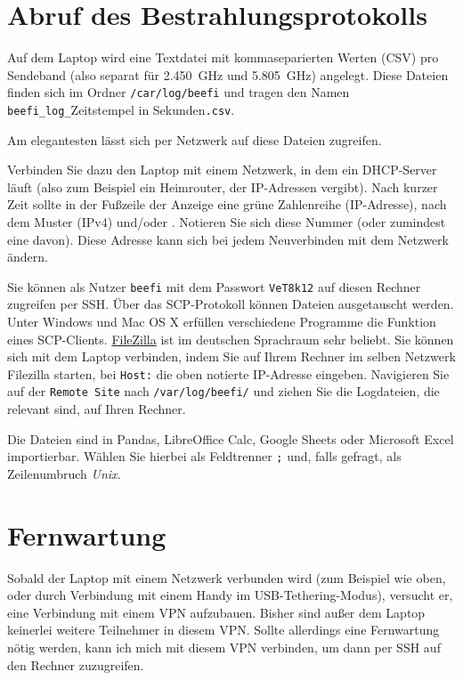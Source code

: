 \documentclass[a4paper,twoside]{scrreprt}
\newcommand{\lowf}{\SI{2.450}{\giga\hertz}}
\newcommand{\highf}{\SI{5.805}{\giga\hertz}}
\begin{document}
\section{Abruf des Bestrahlungsprotokolls}

Auf dem Laptop wird eine Textdatei mit kommaseparierten Werten (CSV) pro
Sendeband (also separat für \lowf{} und \highf) angelegt. Diese Dateien finden
sich im Ordner \texttt{/car/log/beefi} und tragen den Namen
\texttt{beefi\_log\_}Zeitstempel in Sekunden\texttt{.csv}.

Am elegantesten lässt sich per Netzwerk auf diese Dateien zugreifen.

Verbinden Sie dazu den Laptop mit einem Netzwerk, in dem ein DHCP-Server läuft
(also zum Beispiel ein Heimrouter, der IP-Adressen vergibt). Nach kurzer Zeit
sollte in der Fußzeile der Anzeige eine grüne Zahlenreihe (IP-Adresse), nach dem
Muster {} (IPv4) und/oder
{}. Notieren Sie sich
diese Nummer (oder zumindest eine davon). Diese Adresse kann sich bei jedem
Neuverbinden mit dem Netzwerk ändern.

Sie können als Nutzer \texttt{beefi} mit dem Passwort \texttt{VeT8k12} auf diesen
Rechner zugreifen per SSH. Über das SCP-Protokoll können Dateien ausgetauscht
werden. Unter Windows und Mac OS X erfüllen verschiedene Programme die Funktion
eines SCP-Clients. \href{https://filezilla-project.org}{FileZilla} ist im
deutschen Sprachraum sehr beliebt. Sie können sich mit dem Laptop verbinden,
indem Sie auf Ihrem Rechner im selben Netzwerk Filezilla starten, bei
\texttt{Host:} die oben notierte IP-Adresse eingeben. Navigieren Sie auf der
\texttt{Remote Site} nach \texttt{/var/log/beefi/} und ziehen Sie die
Logdateien, die relevant sind, auf Ihren Rechner.

Die Dateien sind in Pandas, LibreOffice Calc, Google Sheets oder Microsoft Excel
importierbar. Wählen Sie hierbei als Feldtrenner \texttt{;} und, falls gefragt,
als Zeilenumbruch \emph{Unix}.

\section{Fernwartung}

Sobald der Laptop mit einem Netzwerk verbunden wird (zum Beispiel wie oben, oder
durch Verbindung mit einem Handy im USB-Tethering-Modus), versucht er, eine
Verbindung mit einem VPN aufzubauen. Bisher sind außer dem Laptop keinerlei
weitere Teilnehmer in diesem VPN. Sollte allerdings eine Fernwartung nötig
werden, kann ich mich mit diesem VPN verbinden, um dann per SSH auf den Rechner
zuzugreifen.
\end{document}
